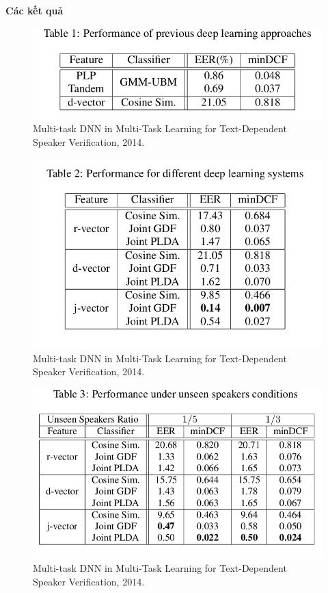 \documentclass{article}
\begin{document}
	\textbf{Các kết quả}
	\begin{figure}[H]
		\centering
		\includegraphics[width=0.75\linewidth]{images/j-vectors-table-01.png}
		\caption{Multi-task DNN in Multi-Task Learning for Text-Dependent Speaker Verification, 2014.}
		\label{fig:writing-thesis}
	\end{figure}
	\begin{figure}[H]
		\centering
		\includegraphics[width=0.75\linewidth]{images/j-vectors-result-table-02.png}
		\caption{Multi-task DNN in Multi-Task Learning for Text-Dependent Speaker Verification, 2014.}
		\label{fig:writing-thesis}
	\end{figure}
	\begin{figure}[H]
		\centering
		\includegraphics[width=0.75\linewidth]{images/j-vectors-result-table-03.png}
		\caption{Multi-task DNN in Multi-Task Learning for Text-Dependent Speaker Verification, 2014.}
		\label{fig:writing-thesis}
	\end{figure}
\end{document}

